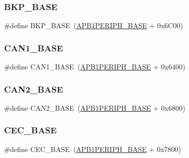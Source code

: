 \subsubsection{\texorpdfstring{BKP\_BASE}{BKP\_BASE}}
{\footnotesize\ttfamily \#define B\+K\+P\+\_\+\+B\+A\+SE~(\mbox{\hyperlink{group___peripheral__memory__map_ga45666d911f39addd4c8c0a0ac3388cfb}{A\+P\+B1\+P\+E\+R\+I\+P\+H\+\_\+\+B\+A\+SE}} + 0x6\+C00)}

\mbox{\label{group___peripheral__memory__map_gad8e45ea6c032d9fce1b0516fff9d8eaa}} 
\subsubsection{\texorpdfstring{CAN1\_BASE}{CAN1\_BASE}}
{\footnotesize\ttfamily \#define C\+A\+N1\+\_\+\+B\+A\+SE~(\mbox{\hyperlink{group___peripheral__memory__map_ga45666d911f39addd4c8c0a0ac3388cfb}{A\+P\+B1\+P\+E\+R\+I\+P\+H\+\_\+\+B\+A\+SE}} + 0x6400)}

\mbox{\label{group___peripheral__memory__map_gaf7b8267b0d439f8f3e82f86be4b9fba1}} 
\subsubsection{\texorpdfstring{CAN2\_BASE}{CAN2\_BASE}}
{\footnotesize\ttfamily \#define C\+A\+N2\+\_\+\+B\+A\+SE~(\mbox{\hyperlink{group___peripheral__memory__map_ga45666d911f39addd4c8c0a0ac3388cfb}{A\+P\+B1\+P\+E\+R\+I\+P\+H\+\_\+\+B\+A\+SE}} + 0x6800)}

\mbox{\label{group___peripheral__memory__map_gaacb77bc44b3f8c87ab98f241e760e440}} 
\subsubsection{\texorpdfstring{CEC\_BASE}{CEC\_BASE}}
{\footnotesize\ttfamily \#define C\+E\+C\+\_\+\+B\+A\+SE~(\mbox{\hyperlink{group___peripheral__memory__map_ga45666d911f39addd4c8c0a0ac3388cfb}{A\+P\+B1\+P\+E\+R\+I\+P\+H\+\_\+\+B\+A\+SE}} + 0x7800)}

